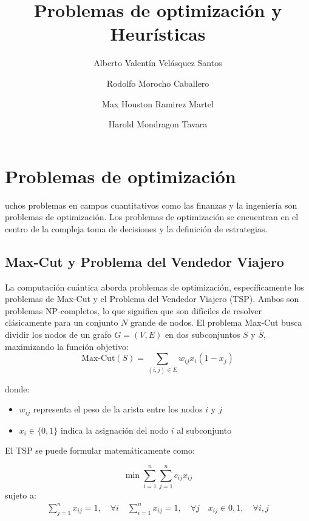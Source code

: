 \documentclass[9pt,a4paper,twoside]{rho-class/rho}
\title{ Problemas de optimización y Heurísticas}
\author[1]{Alberto Valentín Velásquez Santos}
\author[2]{Rodolfo Morocho Caballero}
\author[3]{Max Houston Ramirez Martel}
\author[4]{Harold Mondragon Tavara}
\affil[1]{Alberto Valentín Velásquez Santos}
\affil[2]{Rodolfo Morocho Caballero}
\affil[3]{Max Houston Ramirez Martel}
\affil[4]{Harold Mondragon Tavara}
\begin{document}
	
    \maketitle
    \thispagestyle{firststyle}
    \linenumbers


    \section{Problemas de optimización}

        uchos problemas en campos cuantitativos como las finanzas y la ingeniería son problemas de optimización. Los problemas de optimización se encuentran en el centro de la compleja toma de decisiones y la definición de estrategias.
    
        \subsection{Max-Cut y Problema del Vendedor Viajero}
            La computación cuántica aborda problemas de optimización, específicamente los problemas de Max-Cut y el Problema del Vendedor Viajero (TSP). Ambos son problemas NP-completos, lo que significa que son difíciles de resolver clásicamente para un conjunto $N$ grande de nodos.
            El problema Max-Cut busca dividir los nodos de un grafo $G = (V,E)$ en dos subconjuntos $S$ y $\bar{S}$, maximizando la función objetivo:
            \begin{equation}
                \text{Max-Cut}(S) = \sum_{(i,j) \in E} w_{ij}x_i(1-x_j)
            \end{equation}

            donde:
            \begin{itemize}
                \item $w_{ij}$ representa el peso de la arista entre los nodos $i$ y $j$
                \item $x_i \in \{0,1\}$ indica la asignación del nodo $i$ al subconjunto
            \end{itemize}
            El TSP se puede formular matemáticamente como:

            \begin{equation}
                \min \sum_{i=1}^{n} \sum_{j=1}^{n} c_{ij}x_{ij}
            \end{equation}
            sujeto a:
            \begin{align} \sum_{j=1}^{n} x_{ij} = 1, \quad \forall i \quad \sum_{i=1}^{n} x_{ij} = 1, \quad \forall j \quad x_{ij} \in {0,1}, \quad \forall i,j \end{align}
\end{document}
